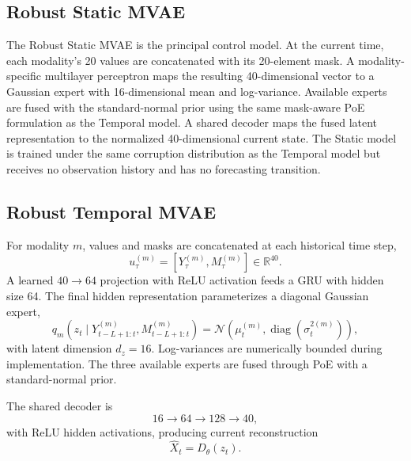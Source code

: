\documentclass[10pt,twocolumn]{article}
\begin{document}
\subsection{Robust Static MVAE}
The Robust Static MVAE is the principal control model. At the current time, each modality's 20 values are concatenated with its 20-element mask. A modality-specific multilayer perceptron maps the resulting 40-dimensional vector to a Gaussian expert with 16-dimensional mean and log-variance. Available experts are fused with the standard-normal prior using the same mask-aware PoE formulation as the Temporal model. A shared decoder maps the fused latent representation to the normalized 40-dimensional current state. The Static model is trained under the same corruption distribution as the Temporal model but receives no observation history and has no forecasting transition.

\subsection{Robust Temporal MVAE}
For modality $m$, values and masks are concatenated at each historical time step,
\begin{equation}
u_{\tau}^{(m)}=[Y_{\tau}^{(m)},M_{\tau}^{(m)}]\in\mathbb{R}^{40}.
\end{equation}
A learned $40\rightarrow64$ projection with ReLU activation feeds a GRU with hidden size 64. The final hidden representation parameterizes a diagonal Gaussian expert,
\begin{equation}
q_m(z_t\mid Y_{t-L+1:t}^{(m)},M_{t-L+1:t}^{(m)})
=\mathcal{N}(\mu_t^{(m)},\operatorname{diag}(\sigma_t^{2(m)})),
\end{equation}
with latent dimension $d_z=16$. Log-variances are numerically bounded during implementation. The three available experts are fused through PoE with a standard-normal prior.

The shared decoder is
\begin{equation}
16\rightarrow64\rightarrow128\rightarrow40,
\end{equation}
with ReLU hidden activations, producing current reconstruction
\begin{equation}
\hat X_t=D_{\theta}(z_t).
\end{equation}
\end{document}
